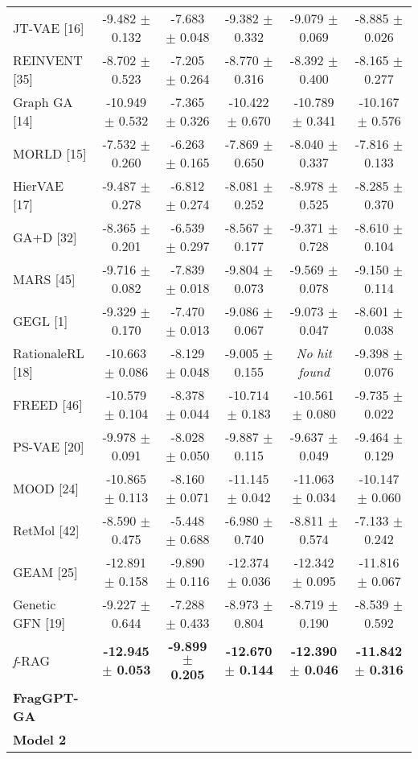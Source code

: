 \documentclass[lettersize,journal]{IEEEtran}
\begin{document}
\begin{table*}[t]
\begin{tabular}{l ccccc}
        JT-VAE [16]    & -9.482 $\pm$ 0.132 & -7.683 $\pm$ 0.048 & -9.382 $\pm$ 0.332 & -9.079 $\pm$ 0.069 & -8.885 $\pm$ 0.026 \\
        REINVENT [35]  & -8.702 $\pm$ 0.523 & -7.205 $\pm$ 0.264 & -8.770 $\pm$ 0.316 & -8.392 $\pm$ 0.400 & -8.165 $\pm$ 0.277 \\
        Graph GA [14]  & -10.949 $\pm$ 0.532 & -7.365 $\pm$ 0.326 & -10.422 $\pm$ 0.670 & -10.789 $\pm$ 0.341 & -10.167 $\pm$ 0.576 \\
        MORLD [15]     & -7.532 $\pm$ 0.260 & -6.263 $\pm$ 0.165 & -7.869 $\pm$ 0.650 & -8.040 $\pm$ 0.337 & -7.816 $\pm$ 0.133 \\
        HierVAE [17]   & -9.487 $\pm$ 0.278 & -6.812 $\pm$ 0.274 & -8.081 $\pm$ 0.252 & -8.978 $\pm$ 0.525 & -8.285 $\pm$ 0.370 \\
        GA+D [32]      & -8.365 $\pm$ 0.201 & -6.539 $\pm$ 0.297 & -8.567 $\pm$ 0.177 & -9.371 $\pm$ 0.728 & -8.610 $\pm$ 0.104 \\
        MARS [45]      & -9.716 $\pm$ 0.082 & -7.839 $\pm$ 0.018 & -9.804 $\pm$ 0.073 & -9.569 $\pm$ 0.078 & -9.150 $\pm$ 0.114 \\
        GEGL [1]       & -9.329 $\pm$ 0.170 & -7.470 $\pm$ 0.013 & -9.086 $\pm$ 0.067 & -9.073 $\pm$ 0.047 & -8.601 $\pm$ 0.038 \\
        RationaleRL [18] & -10.663 $\pm$ 0.086 & -8.129 $\pm$ 0.048 & -9.005 $\pm$ 0.155 & \textit{No hit found} & -9.398 $\pm$ 0.076 \\
        FREED [46]     & -10.579 $\pm$ 0.104 & -8.378 $\pm$ 0.044 & -10.714 $\pm$ 0.183 & -10.561 $\pm$ 0.080 & -9.735 $\pm$ 0.022 \\
        PS-VAE [20]    & -9.978 $\pm$ 0.091 & -8.028 $\pm$ 0.050 & -9.887 $\pm$ 0.115 & -9.637 $\pm$ 0.049 & -9.464 $\pm$ 0.129 \\
        MOOD [24]      & -10.865 $\pm$ 0.113 & -8.160 $\pm$ 0.071 & -11.145 $\pm$ 0.042 & -11.063 $\pm$ 0.034 & -10.147 $\pm$ 0.060 \\
        RetMol [42]    & -8.590 $\pm$ 0.475 & -5.448 $\pm$ 0.688 & -6.980 $\pm$ 0.740 & -8.811 $\pm$ 0.574 & -7.133 $\pm$ 0.242 \\
        GEAM [25]      & -12.891 $\pm$ 0.158 & -9.890 $\pm$ 0.116 & -12.374 $\pm$ 0.036 & -12.342 $\pm$ 0.095 & -11.816 $\pm$ 0.067 \\
        Genetic GFN [19] & -9.227 $\pm$ 0.644 & -7.288 $\pm$ 0.433 & -8.973 $\pm$ 0.804 & -8.719 $\pm$ 0.190 & -8.539 $\pm$ 0.592 \\
        \textit{f}-RAG  & \textbf{-12.945 $\pm$ 0.053} & \textbf{-9.899 $\pm$ 0.205} & \textbf{-12.670 $\pm$ 0.144} & \textbf{-12.390 $\pm$ 0.046} & \textbf{-11.842 $\pm$ 0.316} \\
        \hline
        
        \textbf{FragGPT-GA } & & & & & \\
        \textbf{Model 2} & & & & & \\
        \hline
    \end{tabular}
\end{table*}
\end{document}

